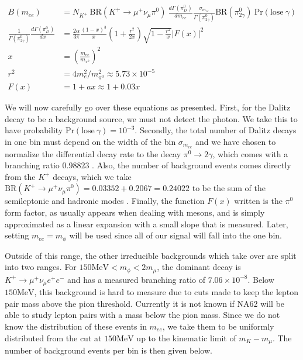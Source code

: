 \begin{align}
\label{eqn:kaon_dalitz_background}
B(m_{ee}) &= N_{K^+}~\textrm{BR}(K^+ \rightarrow \mu^+ \nu_\mu \pi^0)~\frac{d\Gamma(\pi^0_D)}{d m_{ee}} \frac{\sigma_{m_{ee}}}{\Gamma(\pi^0_{2\gamma})} \textrm{BR}(\pi^0_{2\gamma})~\textrm{Pr}(\textrm{lose}~\gamma) \\
\frac{1}{\Gamma(\pi^0_{2\gamma})} \frac{d\Gamma(\pi^0_D)}{dx} &= \frac{2\alpha}{3\pi} \frac{(1-x)^3}{x}(1+\frac{r^2}{2x})\sqrt{1-\frac{r^2}{x}}\left|F(x)\right|^2 \\
x &= \left(\frac{m_{ee}}{m_{\pi^0}}\right)^2 \\
r^2 &= 4 m_e^2 / m_{\pi^0}^2 \approx 5.73\times 10^{-5} \\
F(x) &= 1 + ax \approx 1+0.03x
\end{align}

We will now carefully go over these equations as presented.
First, for the Dalitz decay to be a background source, we must not detect the photon.
We take this to have probability $\textrm{Pr}(\textrm{lose}~\gamma) = 10^{-3}$.
Secondly, the total number of Dalitz decays in one bin must depend on the width of the bin $\sigma_{m_{ee}}$ and we have chosen to normalize the differential decay rate to the decay $\pi^0 \rightarrow 2\gamma$, which comes with a branching ratio $0.98823$ \cite{Agashe:2014kda}.
Also, the number of background events comes directly from the $K^+$ decays, which we take $\textrm{BR}(K^+ \rightarrow \mu^+ \nu_\mu \pi^0) = 0.03352 + 0.2067 = 0.24022$ to be the sum of the semileptonic and hadronic modes \cite{Agashe:2014kda}.
Finally, the function $F(x)$ written is the $\pi^0$ form factor, as usually appears when dealing with mesons, and is simply approximated as a linear expansion with a small slope that is measured.
Later, setting $m_{ee} = m_\phi$ will be used since all of our signal will fall into the one bin.

Outside of this range, the other irreducible backgrounds which take over are split into two ranges.
For $150\textrm{MeV} < m_\phi < 2m_\mu$, the dominant decay is $K^+ \rightarrow \mu^+ \nu_\mu e^+ e^-$ and has a measured branching ratio of $7.06 \times 10^{-8}$.
Below $150\textrm{MeV}$, this background is hard to measure due to cuts made to keep the lepton pair mass above the pion threshold.
Currently it is not known if NA62 will be able to study lepton pairs with a mass below the pion mass.
Since we do not know the distribution of these events in $m_{ee}$, we take them to be uniformly distributed from the cut at $150\textrm{MeV}$ up to the kinematic limit of $m_K - m_\mu$.
The number of background events per bin is then given below.

